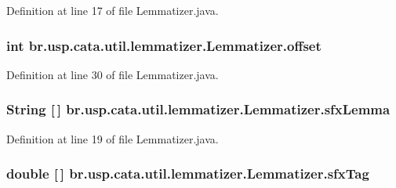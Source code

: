 Definition at line 17 of file Lemmatizer.\+java.

\hypertarget{classbr_1_1usp_1_1cata_1_1util_1_1lemmatizer_1_1_lemmatizer_a3051729334b2dc06ccfdfc174e626855}{
\subsubsection[{offset}]{\setlength{\rightskip}{0pt plus 5cm}int br.\+usp.\+cata.\+util.\+lemmatizer.\+Lemmatizer.\+offset\hspace{0.3cm}{\ttfamily [private]}}}\label{classbr_1_1usp_1_1cata_1_1util_1_1lemmatizer_1_1_lemmatizer_a3051729334b2dc06ccfdfc174e626855}


Definition at line 30 of file Lemmatizer.\+java.

\hypertarget{classbr_1_1usp_1_1cata_1_1util_1_1lemmatizer_1_1_lemmatizer_ad463cf85858239be045abe482da23ccd}{
\subsubsection[{sfx\+Lemma}]{\setlength{\rightskip}{0pt plus 5cm}String \mbox{[}$\,$\mbox{]} br.\+usp.\+cata.\+util.\+lemmatizer.\+Lemmatizer.\+sfx\+Lemma\hspace{0.3cm}{\ttfamily [private]}}}\label{classbr_1_1usp_1_1cata_1_1util_1_1lemmatizer_1_1_lemmatizer_ad463cf85858239be045abe482da23ccd}


Definition at line 19 of file Lemmatizer.\+java.

\hypertarget{classbr_1_1usp_1_1cata_1_1util_1_1lemmatizer_1_1_lemmatizer_a0a4ee06a801fb6ac283095a0ca771496}{
\subsubsection[{sfx\+Tag}]{\setlength{\rightskip}{0pt plus 5cm}double \mbox{[}$\,$\mbox{]} br.\+usp.\+cata.\+util.\+lemmatizer.\+Lemmatizer.\+sfx\+Tag\hspace{0.3cm}{\ttfamily [private]}}}\label{classbr_1_1usp_1_1cata_1_1util_1_1lemmatizer_1_1_lemmatizer_a0a4ee06a801fb6ac283095a0ca771496}


